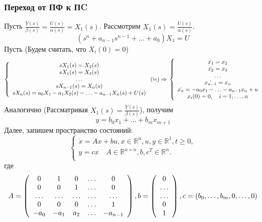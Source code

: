 \documentclass[A4]{article}
\begin{document}
\subsubsection{Переход от ПФ к ПC}
Пусть $\frac{Y(s)}{\beta(s)}=\frac{U(s)}{\alpha(s)}=X_1(s)$. Рассмотрим $X_1(s)=\frac{U(s)}{\alpha(s)}$.
\begin{equation}
(s^n+a_{n-1}s^{n-1}+\ldots+a_0)X_1=U
\end{equation}
Пусть (Будем считать, что $X_i(0)=0$)
\begin{equation}
\left\{\begin{array}{cc}
sX_1(s)=X_2(s)\\
sX_1(s)=X_3(s)\\
\ldots\\
sX_{n-1}(s)=X_n(s)\\
sX_n(s)=a_0X_1-a_1X_2(s)-\ldots-a_{n-1}X_n(s)+U(s)
\end{array}\right. (\fallingdotseq)\Rightarrow\\
\left\{\begin{array}{cc}
\dot{x_1}=x_2\\
\dot{x_2}=x_3\\
\ldots\\
\dot{x_{n-1}}=x_n\\
\dot{x_n}=-a_0x_1-\ldots-a_{n-1}x_n+u\\
x_i(0)=0,\quad i=1,\ldots,n
\end{array}\right.
\end{equation}
Аналогично (Рассматривая $X_1(s)=\frac{Y(s)}{\beta(s)}$), получим
\begin{equation}
y=b_0x_1+\ldots+b_mx_{m+1}
\end{equation}
Далее, запишем пространство состояний:
\begin{equation}
\left\{\begin{array}{cc}
\dot{x}=Ax+bu,x\in \mathbb{R}^n,u,y\in\mathbb{R}^1,t\ge 0,\\
y=cx\quad A\in \mathbb{R}^{n\times n},b,c^T\in\mathbb{R}^n.\\
\end{array}\right.
\end{equation}
где
\begin{equation*}
A=\left(\begin{array}{ccccc}
0 &1&0&\ldots&0\\
0&0&1&\ldots&0\\
\ldots&\ldots&\ldots&\ldots&\ldots\\
0&0&0&\ldots&1\\
-a_0&-a_1&\-a_2&\ldots&-a_{n-1}\\
\end{array}\right),b=\left(\begin{array}{c}0\\\ldots\\\ldots\\0\\1\end{array}\right),\\c=\left(b_0,\ldots,b_m,0,\ldots,0\right)
\end{equation*}
\end{document}
